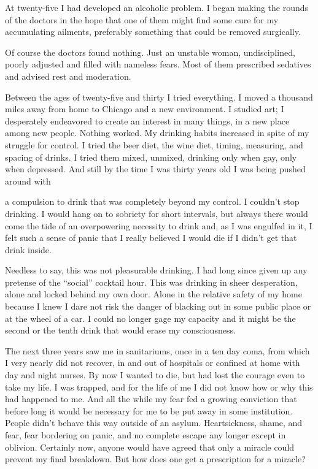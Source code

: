 \begin{biblechapter}
At twenty-five I had developed an alcoholic problem. I began making the rounds of the doctors in the hope that one of them might find some cure for my accumulating ailments, preferably something that could be removed surgically.

Of course the doctors found nothing. Just an unstable woman, undisciplined, poorly adjusted and filled with nameless fears. Most of them prescribed sedatives and advised rest and moderation.

Between the ages of twenty-five and thirty I tried everything. I moved a thousand miles away from home to Chicago and a new environment. I studied art; I desperately endeavored to create an interest in many things, in a new place among new people. Nothing worked. My drinking habits increased in spite of my struggle for control. I tried the beer diet, the wine diet, timing, measuring, and spacing of drinks. I tried them mixed, unmixed, drinking only when gay, only when depressed. And still by the time I was thirty years old I was being pushed around with

a compulsion to drink that was completely beyond my control. I couldn’t stop drinking. I would hang on to sobriety for short intervals, but always there would come the tide of an overpowering necessity to drink and, as I was engulfed in it, I felt such a sense of panic that I really believed I would die if I didn’t get that drink inside.

Needless to say, this was not pleasurable drinking. I had long since given up any pretense of the “social” cocktail hour. This was drinking in sheer desperation, alone and locked behind my own door. Alone in the relative safety of my home because I knew I dare not risk the danger of blacking out in some public place or at the wheel of a car. I could no longer gage my capacity and it might be the second or the tenth drink that would erase my consciousness.

The next three years saw me in sanitariums, once in a ten day coma, from which I very nearly did not recover, in and out of hospitals or confined at home with day and night nurses. By now I wanted to die, but had lost the courage even to take my life. I was trapped, and for the life of me I did not know how or why this had happened to me. And all the while my fear fed a growing conviction that before long it would be necessary for me to be put away in some institution. People didn’t behave this way outside of an asylum. Heartsickness, shame, and fear, fear bordering on panic, and no complete escape any longer except in oblivion. Certainly now, anyone would have agreed that only a miracle could prevent my final breakdown. But how does one get a prescription for a miracle?


\end{biblechapter}
